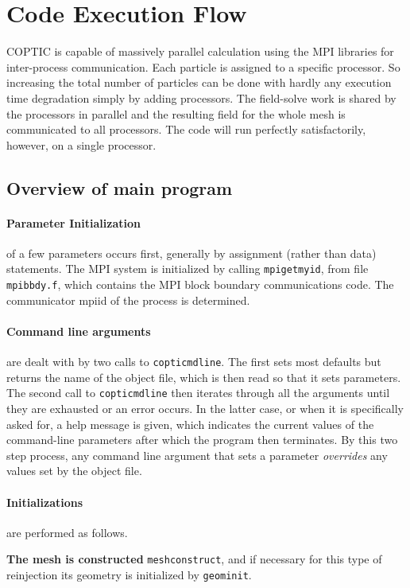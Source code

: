 \documentclass[12pt]{article}
\def\sentence#1{\par\noindent\textbf{#1}}
\begin{document}
\section{Code Execution Flow}

COPTIC is capable of massively parallel calculation using the MPI
libraries for inter-process communication. Each particle is assigned
to a specific processor. So increasing the total number of particles
can be done with hardly any execution time degradation simply by
adding processors. The field-solve work is shared by the processors in
parallel and the resulting field for the whole mesh is communicated to
all processors. The code will run perfectly satisfactorily, however,
on a single processor.

\subsection{Overview of main program}

\paragraph{Parameter Initialization} of a few parameters occurs
first, generally by assignment (rather than data) statements. The MPI
system is initialized by calling \verb!mpigetmyid!, from file
\verb!mpibbdy.f!, which contains the MPI block boundary communications
code. The communicator mpiid of the process is determined.

\paragraph{Command line arguments} are dealt with by two calls to
\verb!copticmdline!. The first sets most defaults but returns the name
of the object file, which is then read so that it sets parameters.
The second call to \verb!copticmdline! then iterates through all the
arguments until they are exhausted or an error occurs. In the latter case,
or when it is specifically asked for, a help message is given, which
indicates the current values of the command-line parameters after
which the program then terminates. By this two step process, any
command line argument that sets a parameter \emph{overrides} any
values set by the object file.

\paragraph{Initializations} are performed as follows.
\sentence{The mesh is constructed} \verb!meshconstruct!, and if
necessary for this type of reinjection its geometry is initialized
by \verb!geominit!.
\end{document}

